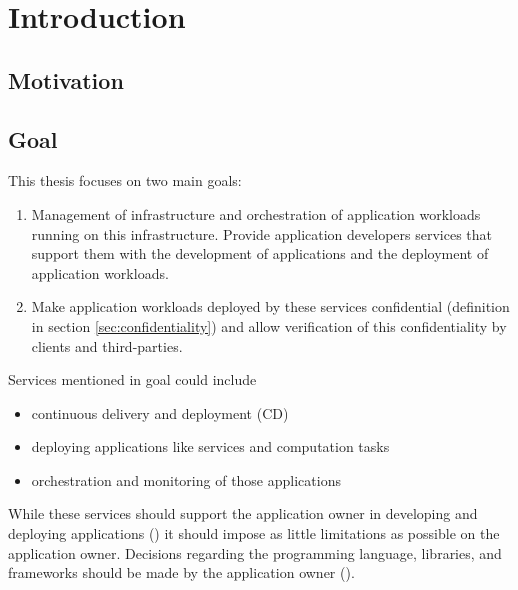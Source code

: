 
\chapter{Introduction}
\label{ch:Introduction}

\section{Motivation}
\label{sec:motivation}

\section{Goal}
\label{sec:goal}


This thesis focuses on two main goals:

\begin{enumerate}[label=\textbf{\Roman*}]
  \item Management of infrastructure and orchestration of application workloads
  running on this infrastructure. Provide application developers services that
  support them with the development of applications and the deployment of
  application workloads.
  \item Make application workloads deployed by these services confidential
  (definition in section \ref{sec:confidentiality}) and allow verification of
  this confidentiality by clients and third-parties.
\end{enumerate}

Services mentioned in goal  could include
\begin{itemize}
  \item continuous delivery and deployment (CD)
  \item deploying applications like services and computation tasks
  \item orchestration and monitoring of those applications
\end{itemize}
While these services should support the application owner in developing and
deploying applications () it should impose as little
limitations as possible on the application owner. Decisions regarding the
programming language, libraries, and frameworks should be made by the
application owner ().

